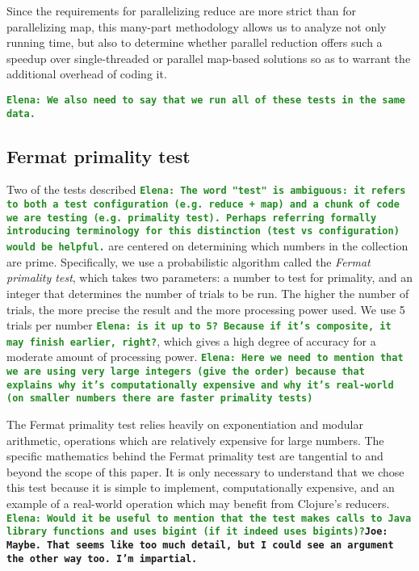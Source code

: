 \documentclass[12pt]{article}
\newcommand{\comment}[1]{{\bf \tt  {#1}}}
\newcommand{\emcomment}[1]{\textcolor{ForestGreen}{\comment{Elena: {#1}}}}
\newcommand{\joecomment}[1]{\textcolor{JoesGold}{\comment{Joe: {#1}}}}
\begin{document}
Since the requirements for parallelizing reduce are more strict than for parallelizing map, this many-part methodology allows us to analyze not only running time, but also to determine whether parallel reduction offers such a speedup over single-threaded or parallel map-based solutions so as to warrant the additional overhead of coding it.

\emcomment{We also need to say that we run all of these tests in the same data.}

\subsection{Fermat primality test}\label{sec:fermat}
Two of the tests described \emcomment{The word "test" is ambiguous: it refers to both a test configuration (e.g. reduce + map) and a chunk of code we are testing (e.g. primality test). Perhaps referring formally introducing terminology for this distinction (test vs configuration) would be helpful.} are centered on determining which numbers in the collection are prime. Specifically, we use a probabilistic algorithm called the \emph{Fermat primality test}, which takes two parameters: a number to test for primality, and an integer that determines the number of trials to be run. The higher the number of trials, the more precise the result and the more processing power used. We use 5 trials per number \emcomment{is it up to 5? Because if it's composite, it may finish earlier, right?}, which gives a high degree of accuracy for a moderate amount of processing power.
\emcomment{Here we need to mention that we are using very large integers (give the order) because that explains why it's computationally expensive and why it's real-world (on smaller numbers there are faster primality tests)}

The Fermat primality test relies heavily on exponentiation and modular arithmetic, operations which are relatively expensive for large numbers. The specific mathematics behind the Fermat primality test are tangential to and beyond the scope of this paper. It is only necessary to understand that we chose this test because it is simple to implement, computationally expensive, and an example of a real-world operation which may benefit from Clojure's reducers.
\emcomment{Would it be useful to mention that the test makes calls to Java library functions and uses bigint (if it indeed uses bigints)?}\joecomment{Maybe. That seems like too much detail, but I could see an argument the other way too. I'm impartial.}
\end{document}

